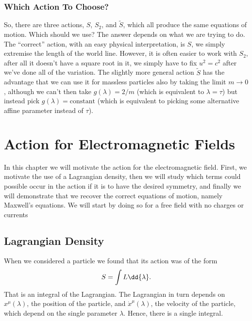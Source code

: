 \subsection{Which Action To Choose?}
So, there are three actions, \(S\), \(S_2\), and \(\tilde{S}\), which all produce the same equations of motion.
Which should we use?
The answer depends on what we are trying to do.
The \enquote{correct} action, with an easy physical interpretation, is \(S\), we simply extremise the length of the world line.
However, it is often easier to work with \(S_2\), after all it doesn't have a square root in it, we simply have to fix \(u^2 = c^2\) after we've done all of the variation.
The slightly more general action \(\tilde{S}\) has the advantage that we can use it for massless particles also by taking the limit \(m \to 0\), although we can't then take \(g(\lambda) = 2/m\) (which is equivalent to \(\lambda = \tau\)) but instead pick \(g(\lambda) = \text{constant}\) (which is equivalent to picking some alternative affine parameter instead of \(\tau\)).

\chapter{Action for Electromagnetic Fields}
In this chapter we will motivate the action for the electromagnetic field.
First, we motivate the use of a Lagrangian density, then we will study which terms could possible occur in the action if it is to have the desired symmetry, and finally we will demonstrate that we recover the correct equations of motion, namely Maxwell's equations.
We will start by doing so for a free field with no charges or currents

\section{Lagrangian Density}
When we considered a particle we found that its action was of the form
\begin{equation}
    S = \int \lagrangian \dd{\lambda}.
\end{equation}
That is an integral of the Lagrangian.
The Lagrangian in turn depends on \(x^\mu(\lambda)\), the position of the particle, and \(\dot{x}^\mu(\lambda)\), the velocity of the particle, which depend on the single parameter \(\lambda\).
Hence, there is a single integral.

